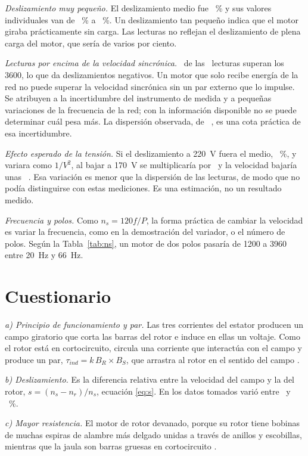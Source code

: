 \documentclass[conference]{IEEEtran}
\begin{document}
\emph{Deslizamiento muy pequeño.} El deslizamiento medio fue \ClMeanSlip~\% y sus valores individuales van de \ClSlipMin~\% a \ClSlipMax~\%. Un deslizamiento tan pequeño indica que el motor giraba prácticamente sin carga. Las lecturas no reflejan el deslizamiento de plena carga del motor, que sería de varios por ciento.

\emph{Lecturas por encima de la velocidad sincrónica.} \ClNabove\ de las \Cn\ lecturas superan los \SI{3600}{\rpm}, lo que da deslizamientos negativos. Un motor que solo recibe energía de la red no puede superar la velocidad sincrónica sin un par externo que lo impulse. Se atribuyen a la incertidumbre del instrumento de medida y a pequeñas variaciones de la frecuencia de la red; con la información disponible no se puede determinar cuál pesa más. La dispersión observada, de \ClSd~\si{\rpm}, es una cota práctica de esa incertidumbre.

\emph{Efecto esperado de la tensión.} Si el deslizamiento a \SI{220}{V} fuera el medio, \ClMeanSlip~\%, y variara como $1/V^2$, al bajar a \SI{170}{V} se multiplicaría por \ClEstFactor\ y la velocidad bajaría unas \ClEstDN~\si{\rpm}. Esa variación es menor que la dispersión de las lecturas, de modo que no podía distinguirse con estas mediciones. Es una estimación, no un resultado medido.

\emph{Frecuencia y polos.} Como $n_s=120f/P$, la forma práctica de cambiar la velocidad es variar la frecuencia, como en la demostración del variador, o el número de polos. Según la Tabla~\ref{tab:ns}, un motor de dos polos pasaría de \SI{1200}{\rpm} a \SI{3960}{\rpm} entre \SI{20}{Hz} y \SI{66}{Hz}.

\section{Cuestionario}
\emph{a) Principio de funcionamiento y par.} Las tres corrientes del estator producen un campo giratorio que corta las barras del rotor e induce en ellas un voltaje. Como el rotor está en cortocircuito, circula una corriente que interactúa con el campo y produce un par, $\tau_{ind}=k\,B_R\times B_S$, que arrastra al rotor en el sentido del campo \cite{chapman}.

\emph{b) Deslizamiento.} Es la diferencia relativa entre la velocidad del campo y la del rotor, $s=(n_s-n_r)/n_s$, ecuación \eqref{eq:s}. En los datos tomados varió entre \ClSlipMin\ y \ClSlipMax~\%.

\emph{c) Mayor resistencia.} El motor de rotor devanado, porque su rotor tiene bobinas de muchas espiras de alambre más delgado unidas a través de anillos y escobillas, mientras que la jaula son barras gruesas en cortocircuito \cite{preinforme}.
\end{document}
